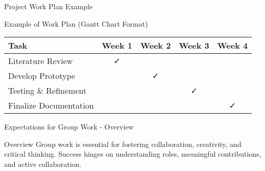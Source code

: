 \documentclass[aspectratio=169]{beamer}
\begin{document}
\begin{frame}[fragile]{Project Work Plan Example}
    \begin{block}{Example of Work Plan (Gantt Chart Format)}
        \begin{tabular}{|l|c|c|c|c|}
            \hline
            \textbf{Task} & \textbf{Week 1} & \textbf{Week 2} & \textbf{Week 3} & \textbf{Week 4} \\
            \hline
            Literature Review & ✓ &   &   &   \\
            Develop Prototype &   & ✓ &   &   \\
            Testing \& Refinement &   &   & ✓ &   \\
            Finalize Documentation &   &   &   & ✓ \\
            \hline
        \end{tabular}
    \end{block}
\end{frame}

\begin{frame}[fragile]{Expectations for Group Work - Overview}
    \begin{block}{Overview}
        Group work is essential for fostering collaboration, creativity, and critical thinking. Success hinges on understanding roles, meaningful contributions, and active collaboration.
    \end{block}
\end{frame}
\end{document}
